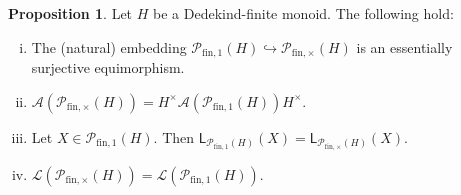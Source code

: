\documentclass{report}
\renewcommand{\P}{\mathcal{P}}
\newcommand{\funt}{{\textrm{fin}, \times}}
\newcommand{\fun}{{\textrm{fin}, 1}}
\renewcommand{\:}{\text{:}}
\theoremstyle{definition}
\newtheorem{prop}[defn]{Proposition}
\begin{document}
\begin{prop}\label{prop:funt&fun-have-the-same-system-of-lengths}
	Let $H$ be a Dedekind-finite monoid. The following hold:
	\begin{enumerate}[(i)]
	\item\label{prop:funt&fun-have-the-same-system-of-lengths(i)} The \textup{(}natural\textup{)} embedding $\P_\fun(H)\hookrightarrow \P_\funt(H)$ is an essentially surjective equimorphism.
	\item\label{prop:funt&fun-have-the-same-system-of-lengths(ii)} $\mathscr{A}(\mathcal P_{\funt}(H)) = H^\times \mathscr{A}(\mathcal P_{\fun}(H)) H^\times$.
	\item\label{prop:funt&fun-have-the-same-system-of-lengths(iii)} Let $X \in \mathcal P_{\fun}(H)$. Then $\mathsf{L}_{\mathcal P_{\fun}(H)}(X) = \mathsf{L}_{\mathcal P_{\funt}(H)}(X)$.
	\item\label{prop:funt&fun-have-the-same-system-of-lengths(iv)} $\mathscr L(\mathcal P_{\funt}(H)) = \mathscr L(\mathcal P_{\fun}(H))$.
	\end{enumerate}
\end{prop}
%
\end{document}
